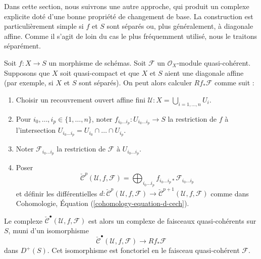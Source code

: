 \medskip\noindent
Dans cette section, nous suivrons une autre approche, qui produit un complexe
explicite doté d'une bonne propriété de changement de base. La construction
est particulièrement simple si $f$ et $S$ sont séparés ou, plus généralement,
à diagonale affine. Comme il s'agit de loin
du cas le plus fréquemment utilisé, nous le traitons séparément.

\begin{lemma}
\label{lemma-separated-case-relative-cech}
Soit $f : X \to S$ un morphisme de schémas.
Soit $\mathcal{F}$ un $\mathcal{O}_X$-module quasi-cohérent.
Supposons que $X$ soit quasi-compact et que $X$ et $S$ aient une diagonale affine
(par exemple, si $X$ et $S$ sont séparés).
On peut alors calculer $Rf_*\mathcal{F}$ comme suit :
\begin{enumerate}
\item Choisir un recouvrement ouvert affine fini
$\mathcal{U} : X = \bigcup_{i = 1, \ldots, n} U_i$.
\item Pour $i_0, \ldots, i_p \in \{1, \ldots, n\}$, noter
$f_{i_0 \ldots i_p} : U_{i_0 \ldots i_p} \to S$ la restriction de $f$
à l'intersection $U_{i_0 \ldots i_p} = U_{i_0} \cap \ldots \cap U_{i_p}$.
\item Noter $\mathcal{F}_{i_0 \ldots i_p}$ la restriction
de $\mathcal{F}$ à $U_{i_0 \ldots i_p}$.
\item Poser
$$
\check{\mathcal{C}}^p(\mathcal{U}, f, \mathcal{F}) =
\bigoplus\nolimits_{i_0 \ldots i_p}
f_{i_0 \ldots i_p *} \mathcal{F}_{i_0 \ldots i_p}
$$
et définir les différentielles
$d : \check{\mathcal{C}}^p(\mathcal{U}, f, \mathcal{F})
\to \check{\mathcal{C}}^{p + 1}(\mathcal{U}, f, \mathcal{F})$
comme dans Cohomologie, Équation (\ref{cohomology-equation-d-cech}).
\end{enumerate}
Le complexe $\check{\mathcal{C}}^\bullet(\mathcal{U}, f, \mathcal{F})$
est alors un complexe de faisceaux quasi-cohérents sur $S$, muni d'un
isomorphisme
$$
\check{\mathcal{C}}^\bullet(\mathcal{U}, f, \mathcal{F})
\longrightarrow
Rf_*\mathcal{F}
$$
dans $D^{+}(S)$. Cet isomorphisme est fonctoriel en le faisceau
quasi-cohérent $\mathcal{F}$.
\end{lemma}

